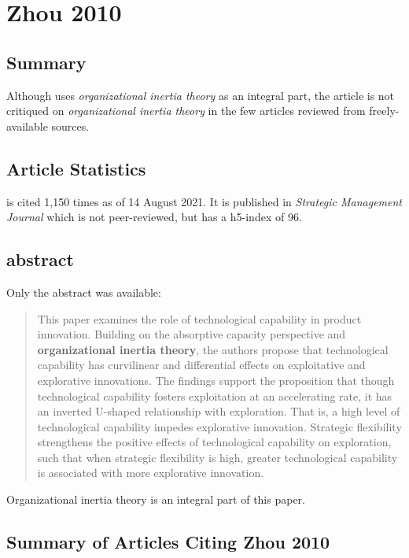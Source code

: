\section{Zhou 2010}

\subsection{Summary}

Although \cite{zhou2010technological} uses \textit{organizational inertia theory} as an integral part, the article is not critiqued on \textit{organizational inertia theory} in the few articles reviewed from freely-available sources.

\subsection{Article Statistics}

\cite{zhou2010technological} is cited 1,150 times as of 14 August 2021. It is published in \textit{Strategic Management Journal} which is not peer-reviewed, but has a h5-index of 96.

\subsection{abstract}

Only the abstract was available:

\begin{quotation}
	This paper examines the role of technological capability in product innovation. Building on the absorptive capacity perspective and \textbf{organizational inertia theory}, the authors propose that technological capability has curvilinear and differential effects on exploitative and explorative innovations. The findings support the proposition that though technological capability fosters exploitation at an accelerating rate, it has an inverted U-shaped relationship with exploration. That is, a high level of technological capability impedes explorative innovation. Strategic flexibility strengthens the positive effects of technological capability on exploration, such that when strategic flexibility is high, greater technological capability is associated with more explorative innovation.
\end{quotation}

Organizational inertia theory is an integral part of this paper.

\subsection{Summary of Articles Citing Zhou 2010}

